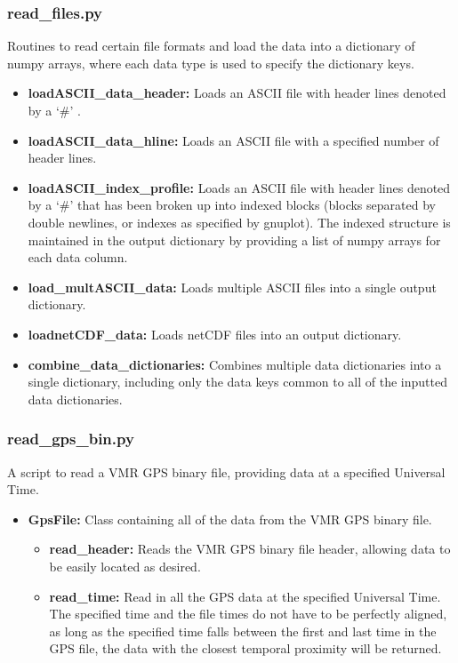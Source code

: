 \subsubsection{read\_files.py}

Routines to read certain file formats and load the data into a dictionary of numpy arrays, where each data type is used to specify the dictionary keys.

\begin{itemize}
\item[]{{\bf loadASCII\_data\_header: } Loads an ASCII file with header lines denoted by a `\#' .}
\item[]{{\bf loadASCII\_data\_hline: } Loads an ASCII file with a specified number of header lines.}
\item[]{{\bf loadASCII\_index\_profile: } Loads an ASCII file with header lines denoted by a `\#' that has been broken up into indexed blocks (blocks separated by double newlines, or indexes as specified by gnuplot).  The indexed structure is maintained in the output dictionary by providing a list of numpy arrays for each data column.}
\item[]{{\bf load\_multASCII\_data:} Loads multiple ASCII files into a single output dictionary.}
\item[]{{\bf loadnetCDF\_data: } Loads netCDF files into an output dictionary.}
\item[]{{\bf combine\_data\_dictionaries: } Combines multiple data dictionaries into a single dictionary, including only the data keys common to all of the inputted data dictionaries.}
\end{itemize}

\subsubsection{read\_gps\_bin.py}

A script to read a VMR GPS binary file, providing data at a specified Universal Time.

\begin{itemize}
\item[]{\bf GpsFile: } Class containing all of the data from the VMR GPS binary file.
	\begin{itemize}
	\item[]{\bf read\_header: } Reads the VMR GPS binary file header, allowing data to be easily located as desired.
	\item[]{\bf read\_time: } Read in all the GPS data at the specified Universal Time.  The specified time and the file times do not have to be perfectly aligned, as long as the specified time falls between the first and last time in the GPS file, the data with the closest temporal proximity will be returned.
	\end{itemize}
\end{itemize}

